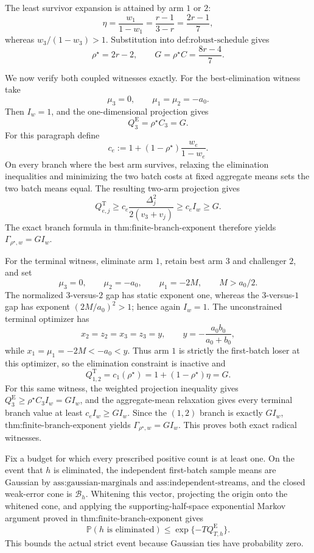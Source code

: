The least survivor expansion is attained by arm \(1\) or \(2\):
\[
 \eta=\frac{w_1}{1-w_1}
 =\frac{r-1}{3-r}
 =\frac{2r-1}{7},
\]
whereas \(w_3/(1-w_3)>1\). Substitution into \(\text{def:robust-schedule}\) gives
\[
 \rho^\star=2r-2,
 \qquad
 G=\rho^\star C=\frac{8r-4}{7}. \tag{13}
\]

We now verify both coupled witnesses exactly. For the best-elimination witness take
\[
 \mu_3=0,\qquad \mu_1=\mu_2=-a_0.
\]
Then \(I_w=1\), and the one-dimensional projection gives
\[
 Q_3^{\mathrm E}=\rho^\star C_3=G.
\]
For this paragraph define
\[
 c_e:=1+(1-\rho^\star)\frac{w_e}{1-w_e}.
\]
On every branch where the best arm survives, relaxing the elimination inequalities and minimizing the two batch costs at fixed aggregate means sets the two batch means equal. The resulting two-arm projection gives
\[
 Q_{e,j}^{\mathrm T}
 \geq c_e\frac{\Delta_j^2}{2(v_3+v_j)}
 \geq c_e I_w\geq G.
\]
The exact branch formula in \(\text{thm:finite-branch-exponent}\) therefore yields \(\Gamma_{\rho^\star,w}=G I_w\).

For the terminal witness, eliminate arm \(1\), retain best arm \(3\) and challenger \(2\), and set
\[
 \mu_3=0,\qquad \mu_2=-a_0,\qquad
 \mu_1=-2M,\qquad M>a_0/2.
\]
The normalized \(3\)-versus-\(2\) gap has static exponent one, whereas the \(3\)-versus-\(1\) gap has exponent \((2M/a_0)^2>1\); hence again \(I_w=1\). The unconstrained terminal optimizer has
\[
 x_2=z_2=x_3=z_3=y,\qquad
 y=-\frac{a_0b_0}{a_0+b_0},
\]
while \(x_1=\mu_1=-2M<-a_0<y\). Thus arm \(1\) is strictly the first-batch loser at this optimizer, so the elimination constraint is inactive and
\[
 Q_{1,2}^{\mathrm T}
 =c_1(\rho^\star)
 =1+(1-\rho^\star)\eta
 =G.
\]
For this same witness, the weighted projection inequality gives \(Q_3^{\mathrm E}\geq\rho^\star C_3I_w=G I_w\), and the aggregate-mean relaxation gives every terminal branch value at least \(c_eI_w\geq G I_w\). Since the \((1,2)\) branch is exactly \(G I_w\), \(\text{thm:finite-branch-exponent}\) yields \(\Gamma_{\rho^\star,w}=G I_w\). This proves both exact radical witnesses.

Fix a budget for which every prescribed positive count is at least one. On the event that \(h\) is eliminated, the independent first-batch sample means are Gaussian by \(\text{ass:gaussian-marginals}\) and \(\text{ass:independent-streams}\), and the closed weak-error cone is \(\mathcal B_h\). Whitening this vector, projecting the origin onto the whitened cone, and applying the supporting-half-space exponential Markov argument proved in \(\text{thm:finite-branch-exponent}\) gives
\[
 \mathbb P(h\text{ is eliminated})
 \leq \exp\{-TQ_{T,h}^{\mathrm E}\}. \tag{14}
\]
This bounds the actual strict event because Gaussian ties have probability zero.

